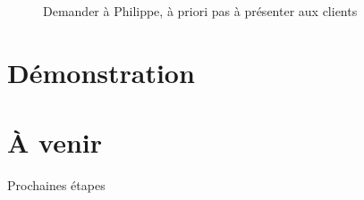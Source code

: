 \documentclass{beamer}
\begin{document}
\begin{frame}{\secname}
	\begin{figure}
		Demander à Philippe, à priori pas à présenter aux clients
	\end{figure}
\end{frame}



\section{Démonstration}

\begin{frame}{\secname}
	\begin{figure}
	\end{figure}
\end{frame}



\section{À venir}

\begin{frame}{\secname}
		Prochaines étapes
\end{frame}
\end{document}

